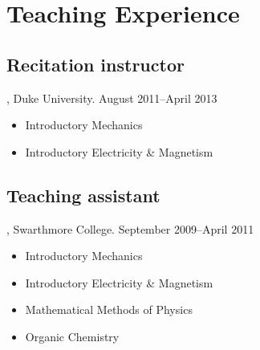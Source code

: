 \documentclass[letterpaper,10pt]{article}
\begin{document}
\section{Teaching Experience}

\subsection{Recitation instructor}, Duke University. \hfill August 2011--April 2013

\begin{itemize}
  \item Introductory Mechanics
  \item Introductory Electricity \& Magnetism
\end{itemize}


\subsection{Teaching assistant}, Swarthmore College. \hfill September 2009--April 2011

\begin{itemize}
  \item Introductory Mechanics
  \item Introductory Electricity \& Magnetism
  \item Mathematical Methods of Physics
  \item Organic Chemistry
\end{itemize}
\end{document}
